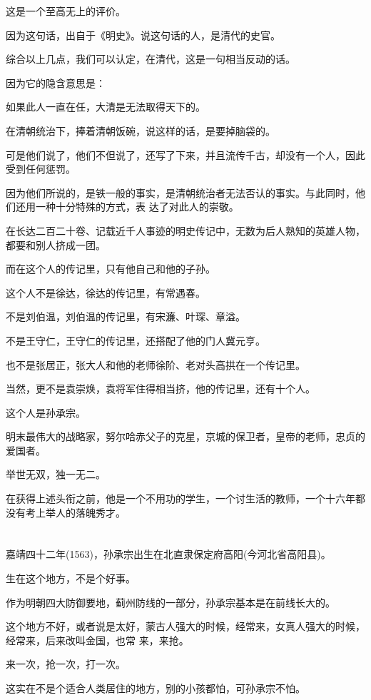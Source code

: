 \documentclass[11pt,a4paper,onecolumn]{article}
\begin{document}
这是一个至高无上的评价。

因为这句话，出自于《明史》。说这句话的人，是清代的史官。

综合以上几点，我们可以认定，在清代，这是一句相当反动的话。

因为它的隐含意思是：

如果此人一直在任，大清是无法取得天下的。

在清朝统治下，捧着清朝饭碗，说这样的话，是要掉脑袋的。

可是他们说了，他们不但说了，还写了下来，并且流传千古，却没有一个人，因此受到任何惩罚。

因为他们所说的，是铁一般的事实，是清朝统治者无法否认的事实。与此同时，他们还用一种十分特殊的方式，表
达了对此人的崇敬。

在长达二百二十卷、记载近千人事迹的明史传记中，无数为后人熟知的英雄人物，都要和别人挤成一团。

而在这个人的传记里，只有他自己和他的子孙。

这个人不是徐达，徐达的传记里，有常遇春。

不是刘伯温，刘伯温的传记里，有宋濂、叶琛、章溢。

不是王守仁，王守仁的传记里，还搭配了他的门人冀元亨。

也不是张居正，张大人和他的老师徐阶、老对头高拱在一个传记里。

当然，更不是袁崇焕，袁将军住得相当挤，他的传记里，还有十个人。

这个人是孙承宗。

明末最伟大的战略家，努尔哈赤父子的克星，京城的保卫者，皇帝的老师，忠贞的爱国者。

举世无双，独一无二。

在获得上述头衔之前，他是一个不用功的学生，一个讨生活的教师，一个十六年都没有考上举人的落魄秀才。

\section[\thesection]{}

嘉靖四十二年(1563)，孙承宗出生在北直隶保定府高阳(今河北省高阳县)。

生在这个地方，不是个好事。

作为明朝四大防御要地，蓟州防线的一部分，孙承宗基本是在前线长大的。

这个地方不好，或者说是太好，蒙古人强大的时候，经常来，女真人强大的时候，经常来，后来改叫金国，也常
来，来抢。

来一次，抢一次，打一次。

这实在不是个适合人类居住的地方，别的小孩都怕，可孙承宗不怕。
\end{document}
